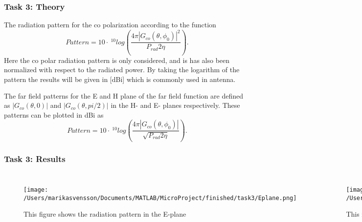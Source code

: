 \begin{frame}
\frametitle{Task 3: Theory}
The radiation pattern for the co polarization according to the function 
\begin{equation}
Pattern = 10\cdot~^{10}log\left(\frac{4\pi |G_{co}(\theta, \phi_0)|^2}{P_{rad}2\eta} \right).
\end{equation}
Here the co polar radiation pattern is only considered, and is has also been normalized with respect to the radiated power. By taking the logarithm of the pattern the results will be given in [dBi] which is commonly used in antenna.

The far field patterns for the E and H plane of the far field function are defined as $|G_{co}(\theta , 0)|$ and $|G_{co}(\theta , pi/2)|$ in the H- and E- planes respectively. These patterns can be plotted in dBi as 
\begin{equation}
Pattern = 10 \cdot ~^{10}log\left(\frac{4\pi |G_{co}(\theta, \phi_0)|}{\sqrt{P_{rad}2\eta}} \right).
\end{equation}
\end{frame}



\begin{frame}
\frametitle{Task 3: Results}
\begin{columns}[c]

\begin{figure}[h]
\centering
\texttt{[image: /Users/marikasvensson/Documents/MATLAB/MicroProject/finished/task3/Eplane.png]}
\caption{This figure shows the radiation pattern in the E-plane}
\label{task3:E-plane}
\end{figure}

\begin{figure}[h]
\centering
\texttt{[image: /Users/marikasvensson/Documents/MATLAB/MicroProject/finished/task3/Hplane.png]}
\caption{This figure shows the radiation pattern in the H-plane}
\label{task3:H-plane}
\end{figure}

\end{columns}
\end{frame}


